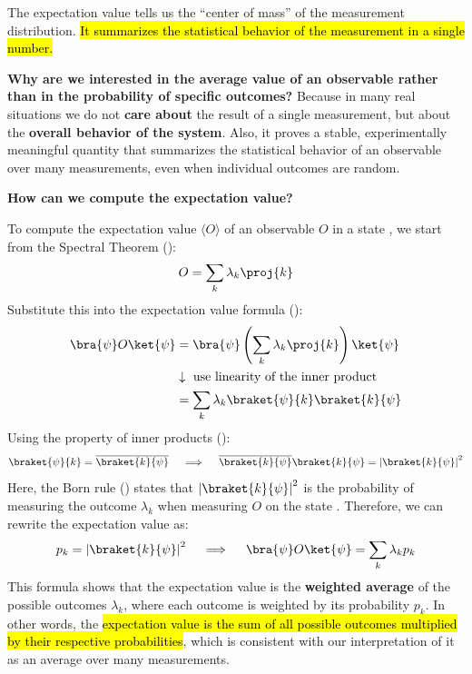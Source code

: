 \highspace
The expectation value tells us the ``center of mass'' of the measurement distribution. \hl{It summarizes the statistical behavior of the measurement in a single number.}

\highspace
\textcolor{Green3}{ \textbf{Why are we interested in the average value of an observable rather than in the probability of specific outcomes?}} Because in many real situations we do not \textbf{care about} the result of a single measurement, but about the \textbf{overall behavior of the system}. Also, it proves a stable, experimentally meaningful quantity that summarizes the statistical behavior of an observable over many measurements, even when individual outcomes are random.

\highspace
\begin{flushleft}
    \textcolor{Green3}{ \textbf{How can we compute the expectation value?}}
\end{flushleft}
To compute the expectation value $\langle O \rangle$ of an observable $O$ in a state \ket{\psi}, we start from the Spectral Theorem ():
\begin{equation*}
    O = \sum_k \lambda_k \proj{k}
\end{equation*}
Substitute this into the expectation value formula ():
\begin{align*}
    \bra{\psi} O \ket{\psi} &= \bra{\psi} \left( \sum_k \lambda_k \proj{k} \right) \ket{\psi} \\
    &\downarrow
    \text{ use linearity of the inner product} \\
    &=
    \sum_k \lambda_k \braket{\psi}{k} \braket{k}{\psi}
\end{align*}
Using the property of inner products ():
\begin{equation*}
    \braket{\psi}{k} = \overline{\braket{k}{\psi}} \quad \implies \quad \overline{\braket{k}{\psi}} \braket{k}{\psi} = \left|\braket{k}{\psi}\right|^{2}
\end{equation*}
Here, the Born rule () states that $\left|\braket{k}{\psi}\right|^{2}$ is the probability of measuring the outcome $\lambda_k$ when measuring $O$ on the state \ket{\psi}. Therefore, we can rewrite the expectation value as:
\begin{equation}\label{eq:expectation-value-probabilities}
    p_k = \left|\braket{k}{\psi}\right|^{2} \quad \implies \quad \bra{\psi} O \ket{\psi} = \sum_k \lambda_k p_k
\end{equation}
This formula shows that the expectation value is the \textbf{weighted average} of the possible outcomes $\lambda_k$, where each outcome is weighted by its probability $p_k$. In other words, the \hl{expectation value is the sum of all possible outcomes multiplied by their respective probabilities}, which is consistent with our interpretation of it as an average over many measurements.